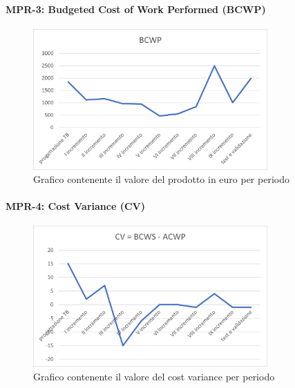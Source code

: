 \newpage

\paragraph{MPR-3: Budgeted Cost of Work Performed (BCWP)}\label{_BCWP}
\begin{center}
    \begin{figure}[!htb]
    \centering
    \includegraphics[width=0.8\textwidth]{res/images/metriche_costi/BCWP.png}
    \caption{Grafico contenente il valore del prodotto in euro per periodo}
\end{figure}
\end{center}


\paragraph{MPR-4: Cost Variance (CV)}\label{_CV}
\begin{center}
    \begin{figure}[!htb]
    \centering
    \includegraphics[width=0.8\textwidth]{res/images/metriche_costi/CV.png}
    \caption{Grafico contenente il valore del cost variance per periodo}
\end{figure}
\end{center}

